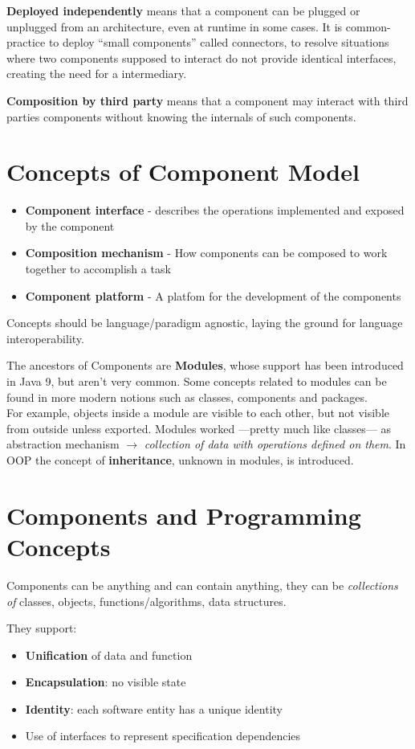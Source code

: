 \textbf{Deployed independently} means that a component can be plugged or unplugged from an architecture, even at runtime in some cases.
It is common-practice to deploy ``small components'' called connectors,
to resolve situations where two components supposed to interact do not provide identical interfaces,
creating the need for a intermediary.

\textbf{Composition by third party} means that a component may interact with third parties components without knowing the internals of such components.

\section{Concepts of Component Model}
\begin{itemize}
    \item \textbf{Component interface} - describes the operations implemented and exposed by the component
    \item \textbf{Composition mechanism} - How components can be composed to work together to accomplish a task
    \item \textbf{Component platform} - A platfom for the development of the components
\end{itemize}
Concepts should be language/paradigm agnostic, laying the ground for language interoperability.
\nl

The ancestors of Components are \textbf{Modules}, whose support has been introduced in Java 9, but aren't very common.
Some concepts related to modules can be found in more modern notions such as classes, components and packages.\\
For example, objects inside a module are visible to each other, but not visible from outside unless exported.
Modules worked ---pretty much like classes--- as abstraction mechanism $\rightarrow$ \textit{collection of data with operations defined on them}.
In OOP the concept of \textbf{inheritance}, unknown in modules, is introduced.
\nl


\section{Components and Programming Concepts}
Components can be anything and can contain anything, they can be \textit{collections of} classes, objects, functions/algorithms, data structures.\\
{They support:\ns
\begin{itemize}
	\item \textbf{Unification} of data and function
	\item \textbf{Encapsulation}: no visible state
	\item \textbf{Identity}: each software entity has a unique identity
	\item Use of interfaces to represent specification dependencies
\end{itemize}}

